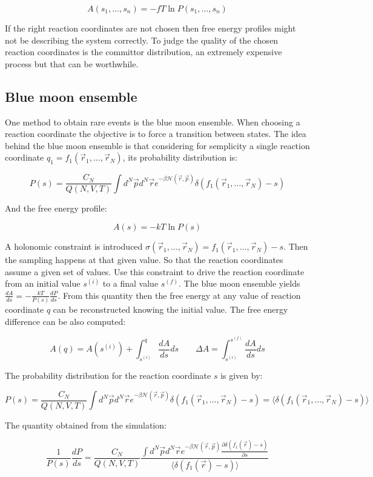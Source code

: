 $$A(s_1, \dots, s_n) = -fT\ln P(s_1, \dots, s_n)$$

If the right reaction coordinates are not chosen then free energy profiles might not be describing the system correctly.
To judge the quality of the chosen reaction coordinates is the committor distribution, an extremely expensive process but that can be worthwhile.

	\subsection{Blue moon ensemble}
	One method to obtain rare events is the blue moon ensemble.
	When choosing a reaction coordinate the objective is to force a transition between states.
	The idea behind the blue moon ensemble is that considering for semplicity a single reaction coordinate $q_1 = f_1(\vec{r}_1, \dots, \vec{r}_N)$, its probability distribution is:

	$$P(s) = \frac{C_N}{Q(N, V, T)}\int d^N\vec{p}d^N\vec{r}e^{-\beta\mathcal{H}(\vec{r}, \vec{p})}\delta(f_1(\vec{r}_1, \dots, \vec{r}_N)-s)$$

	And the free energy profile:

	$$A(s) = -kT\ln P(s)$$

	A holonomic constraint is introduced $\sigma(\vec{r}_1, \dots, \vec{r}_N) = f_1(\vec{r}_1, \dots, \vec{r}_N)-s$.
	Then the sampling happens at that given value.
	So that the reaction coordinates assume a given set of values.
	Use this constraint to drive the reaction coordinate from an initial value $s^{(i)}$ to a final value $s^{(f)}$.
	The blue moon ensemble yields $\frac{dA}{ds} = -\frac{kT}{P(s)}\frac{dP}{ds}$.
	From this quantity then the free energy at any value of reaction coordinate $q$ can be reconstructed knowing the initial value.
	The free energy difference can be also computed:

	$$A(q) = A(s^{(i)}) + \int_{s^{(i)}}^q\frac{dA}{ds}ds\qquad \Delta A = \int_{s^{(i)}}^{s^{(f)}}\frac{dA}{ds}ds$$

	The probability distribution for the reaction coordinate $s$ is given by:

	$$P(s) = \frac{C_N}{Q(N, V, T)}\int d^N\vec{p}d^N\vec{r}e^{-\beta\mathcal{H}(\vec{r}, \vec{p})}\delta(f_1(\vec{r}_1, \dots, \vec{r}_N)-s) = \langle\delta(f_1(\vec{r}_1, \dots, \vec{r}_N)-s)\rangle$$

	The quantity obtained from the simulation:

	$$\frac{1}{P(s)}\frac{dP}{ds} = \frac{C_N}{Q(N, V, T)}\frac{\int d^N\vec{p}d^N\vec{r}e^{-\beta\mathcal{H}(\vec{r}, \vec{p})}\frac{\partial\delta(f_1(\vec{r})-s)}{\partial s}}{\langle\delta(f_1(\vec{r})-s)\rangle}$$

